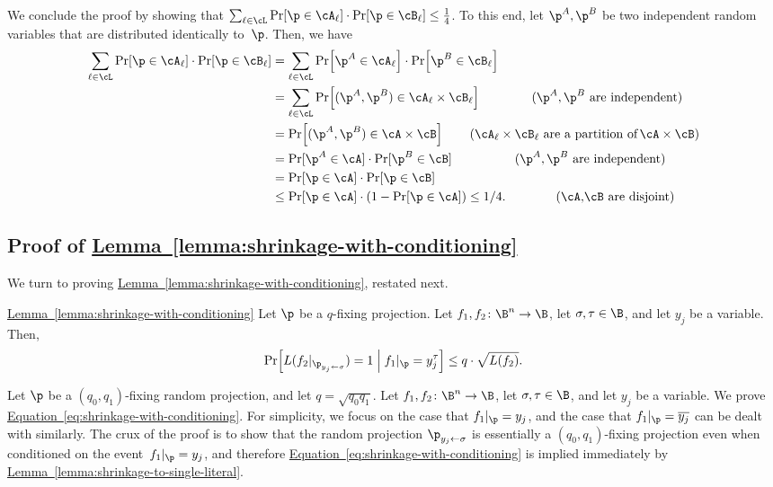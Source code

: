 \documentclass[11pt]{article}
\numberwithin{equation}{section}
\theoremstyle{definition}
\theoremstyle{plain}
\newcommand{\expref}[2]{\hyperref[#2]{#1~\ref{#2}}}
\theoremstyle{definition}\newtheorem{notation}[theorem]{Notation}\theoremstyle{plain}
\begin{document}
We conclude the proof by showing that $\sum_{\ell\in\cL}\Pr\!\left[\p\in\cA_{\ell}\right]\cdot\Pr\!\left[\p\in\cB_{\ell}\right]\le\frac{1}{4}$.
To this end, let $\p^{A},\p^{B}$ be two independent random variables
that are distributed identically to~$\p$. Then, we have 
\begin{align*}  %
\sum_{\ell\in\cL}\Pr\!\left[\p\in\cA_{\ell}\right]\cdot\Pr\!\left[\p\in\cB_{\ell}\right] & =\sum_{\ell\in\cL}\Pr\!\left[\p^{A}\in\cA_{\ell}\right]\cdot\Pr\!\left[\p^{B}\in\cB_{\ell}\right]\\
 & =\sum_{\ell\in\cL}\Pr\!\left[(\p^{A},\p^{B})\in\cA_{\ell}\times\cB_{\ell}\right] %
\qquad\quad\ \ \ \text{(\ensuremath{\p^{A},\p^{B}} are independent)}\\  %
& =\Pr\!\left[(\p^{A},\p^{B})\in\cA\times\cB\right]
%
\qquad   %
 \text{(\ensuremath{\cA_{\ell}\times\cB_{\ell}} are a partition of\,\ensuremath{\cA\times\cB})}\\    %
 & =\Pr[\p^{A}\in\cA]\cdot\Pr[\p^{B}\in\cB] %
\qquad\qquad\quad \text{(\ensuremath{\p^{A},\p^{B}} are independent)}\\  %
 & =\Pr[\p\in\cA]\cdot\Pr[\p\in\cB]\\
 & \le\Pr[\p\in\cA]\cdot\left(1-\Pr[\p\in\cA]\right) 
%
\le 1/4.  %
%
\qquad\qquad \text{(\ensuremath{\cA},\ensuremath{\cB} are disjoint)}\\   %
\end{align*}
%
%

\subsection{\label{subsec:shrinkage-to-two-literals}Proof of \expref{Lemma}{lemma:shrinkage-with-conditioning}}

We turn to proving \expref{Lemma}{lemma:shrinkage-with-conditioning}, 
restated next.
\begin{restated}{\expref{Lemma}{lemma:shrinkage-with-conditioning}}
Let $\p$ be a $q$-fixing projection. Let $f_{1},f_{2}\colon\B^{n}\to\B$,
let $\sigma,\tau\in\B$, and let $y_{j}$ be a variable. Then, 
\begin{equation}
\Pr\!\left[L(f_{2}|_{\p_{y_{j}\gets\sigma}})=1\;\middle|\;f_{1}|_{\p}=y_{j}^{\tau}\right]\le q\cdot\sqrt{L(f_{2})}.\label{eq:shrinkage-with-conditioning}
\end{equation}
\end{restated}

Let $\p$ be a $(q_{0},q_{1})$-fixing random projection, and let
$q=\sqrt{q_{0}q_{1}}$. Let $f_{1},f_{2}\colon\B^{n}\to\B$, let $\sigma,\tau\in\B$,
and let $y_{j}$ be a variable. We prove \expref{Equation}{eq:shrinkage-with-conditioning}.
For simplicity, we focus on the case that $f_{1}|_{\p}=y_{j}$, and
the case that $f_{1}|_{\p}=\overline{y_{j}}$ can be dealt with similarly.
The crux of the proof is to show that the random projection $\p_{y_{j}\gets\sigma}$
is essentially a $(q_{0},q_{1})$-fixing projection even when conditioned
on the event~$f_{1}|_{\p}=y_{j}$, and therefore \expref{Equation}{eq:shrinkage-with-conditioning}
is implied immediately by \expref{Lemma}{lemma:shrinkage-to-single-literal}.
\end{document}
